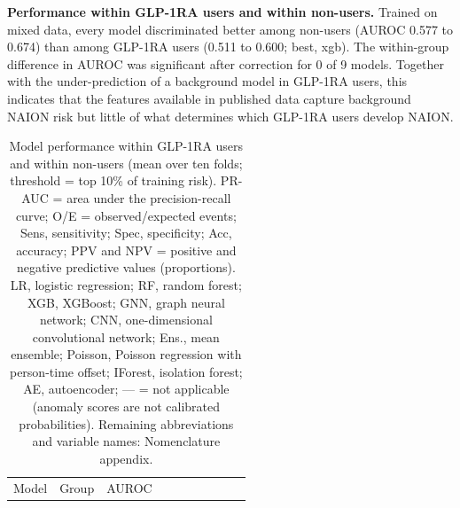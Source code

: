 \documentclass[
  11pt,
]{article}
\begin{document}
\textbf{Performance within GLP-1RA users and within non-users.} Trained
on mixed data, every model discriminated better among non-users (AUROC
0.577 to 0.674) than among GLP-1RA users (0.511 to 0.600; best, xgb).
The within-group difference in AUROC was significant after correction
for 0 of 9 models. Together with the under-prediction of a background
model in GLP-1RA users, this indicates that the features available in
published data capture background NAION risk but little of what
determines which GLP-1RA users develop NAION.

\begin{longtable}[]{@{}
  >{\raggedright\arraybackslash}p{}
  >{\raggedright\arraybackslash}p{}
  >{\raggedright\arraybackslash}p{}
  >{\raggedright\arraybackslash}p{}
  >{\raggedright\arraybackslash}p{}
  >{\raggedright\arraybackslash}p{}
  >{\raggedright\arraybackslash}p{}
  >{\raggedright\arraybackslash}p{}
  >{\raggedright\arraybackslash}p{}
  >{\raggedright\arraybackslash}p{}@{}}
\caption{Model performance within GLP-1RA users and within non-users
(mean over ten folds; threshold = top 10\% of training risk). PR-AUC =
area under the precision-recall curve; O/E = observed/expected events;
Sens, sensitivity; Spec, specificity; Acc, accuracy; PPV and NPV =
positive and negative predictive values (proportions). LR, logistic
regression; RF, random forest; XGB, XGBoost; GNN, graph neural network;
CNN, one-dimensional convolutional network; Ens., mean ensemble;
Poisson, Poisson regression with person-time offset; IForest, isolation
forest; AE, autoencoder; --- = not applicable (anomaly scores are not
calibrated probabilities). Remaining abbreviations and variable names:
Nomenclature appendix.}\tabularnewline
\toprule\noalign{}
\begin{minipage}[b]{\linewidth}\raggedright
Model
\end{minipage} & \begin{minipage}[b]{\linewidth}\raggedright
Group
\end{minipage} & \begin{minipage}[b]{\linewidth}\raggedright
AUROC
\end{minipage} & \begin{minipage}[b]{\linewidth}\raggedright

\end{minipage}
\end{longtable}
\end{document}
